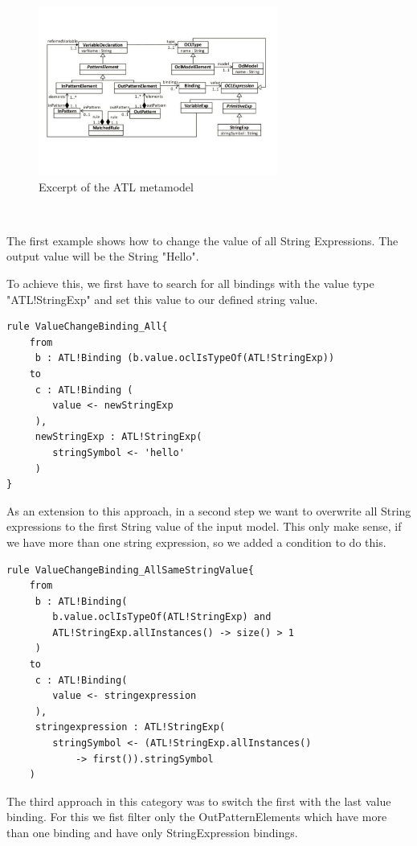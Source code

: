 \documentclass{llncs}
\begin{document}
\begin{figure}
	\centering
	\includegraphics[width=0.7\textwidth,natwidth=610,natheight=642]{figures/ATL_Metamodel_Excerpt}
	\caption{Excerpt of the ATL metamodel}
	\label{fig:atl_metamodel_excerpt}
\end{figure}~

The first example shows how to change the value of all String Expressions. The output value will be the String "Hello".

To achieve this, we first have to search for all bindings with the value type "ATL!StringExp" and set this value to our defined string value.

\begin{lstlisting}
rule ValueChangeBinding_All{
	from
	 b : ATL!Binding (b.value.oclIsTypeOf(ATL!StringExp))
	to
	 c : ATL!Binding (
	 	value <- newStringExp
	 ),
	 newStringExp : ATL!StringExp(
	 	stringSymbol <- 'hello'	
	 )
}
\end{lstlisting}

As an extension to this approach, in a second step we want to overwrite all String expressions to the first String value of the input model. This only make sense, if we have more than one string expression, so we added a condition to do this.

\begin{lstlisting}
rule ValueChangeBinding_AllSameStringValue{
	from
	 b : ATL!Binding(
	 	b.value.oclIsTypeOf(ATL!StringExp) and 
		ATL!StringExp.allInstances() -> size() > 1
	 )
	to
	 c : ATL!Binding(
	 	value <- stringexpression
	 ), 
	 stringexpression : ATL!StringExp(
	 	stringSymbol <- (ATL!StringExp.allInstances() 
			-> first()).stringSymbol
	)
\end{lstlisting}

The third approach in this category was to switch the first with the last value binding. For this we fist filter only the OutPatternElements which have more than one binding and have only StringExpression bindings.
\end{document}
